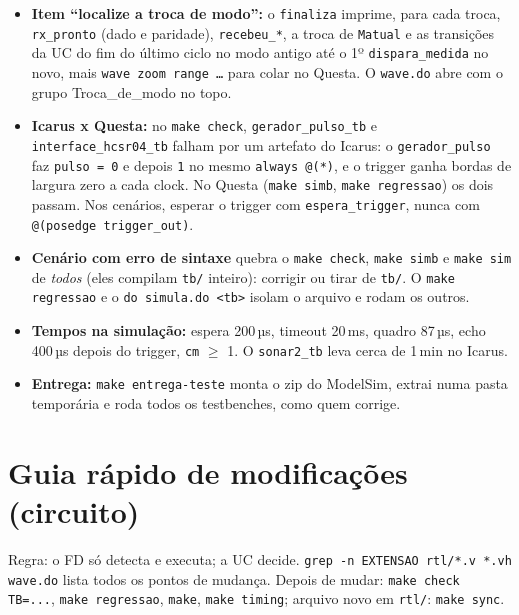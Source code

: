\documentclass[9pt,a4paper]{extarticle}
\newcommand{\s}[1]{\texttt{#1}}          %
\begin{document}
\begin{itemize}[before=\raggedright]
  \item \textbf{Item ``localize a troca de modo'':} o \s{finaliza} imprime, para
        cada troca, \s{rx\_pronto} (dado e paridade), \s{recebeu\_*}, a troca de
        \s{Matual} e as transições da UC do fim do último ciclo no modo antigo até o
        1º \s{dispara\_medida} no novo, mais \s{wave zoom range \ldots} para colar
        no Questa. O \s{wave.do} abre com o grupo Troca\_de\_modo no topo.
  \item \textbf{Icarus x Questa:} no \s{make check}, \s{gerador\_pulso\_tb} e
        \s{interface\_hcsr04\_tb} falham por um artefato do Icarus: o
        \s{gerador\_pulso} faz \s{pulso = 0} e depois \s{1} no mesmo
        \s{always @(*)}, e o trigger ganha bordas de largura zero a cada clock. No
        Questa (\s{make simb}, \s{make regressao}) os dois passam. Nos cenários,
        esperar o trigger com \s{espera\_trigger}, nunca com \s{@(posedge trigger\_out)}.
  \item \textbf{Cenário com erro de sintaxe} quebra o \s{make check},
        \s{make simb} e \s{make sim} de \emph{todos} (eles compilam \s{tb/}
        inteiro): corrigir ou tirar de \s{tb/}. O \s{make regressao} e o
        \s{do simula.do <tb>} isolam o arquivo e rodam os outros.
  \item \textbf{Tempos na simulação:} espera 200\,µs, timeout 20\,ms, quadro
        87\,µs, echo 400\,µs depois do trigger, \s{cm} $\geq$ 1. O \s{sonar2\_tb}
        leva cerca de 1\,min no Icarus.
  \item \textbf{Entrega:} \s{make entrega-teste} monta o zip do ModelSim, extrai
        numa pasta temporária e roda todos os testbenches, como quem corrige.
\end{itemize}

\section{Guia rápido de modificações (circuito)}

Regra: o FD só detecta e executa; a UC decide.
\s{grep -n EXTENSAO rtl/*.v *.vh wave.do} lista todos os pontos de mudança. Depois de
mudar: \s{make check TB=...}, \s{make regressao}, \s{make}, \s{make timing}; arquivo
novo em \s{rtl/}: \s{make sync}.
\end{document}
